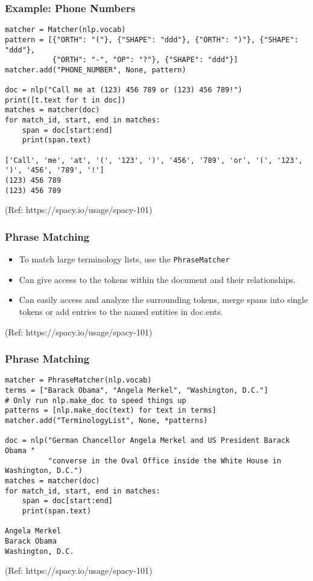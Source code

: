\begin{frame}[fragile]\frametitle{Example: Phone Numbers}



\begin{lstlisting}
matcher = Matcher(nlp.vocab)
pattern = [{"ORTH": "("}, {"SHAPE": "ddd"}, {"ORTH": ")"}, {"SHAPE": "ddd"},
           {"ORTH": "-", "OP": "?"}, {"SHAPE": "ddd"}]
matcher.add("PHONE_NUMBER", None, pattern)

doc = nlp("Call me at (123) 456 789 or (123) 456 789!")
print([t.text for t in doc])
matches = matcher(doc)
for match_id, start, end in matches:
    span = doc[start:end]
    print(span.text)
		
['Call', 'me', 'at', '(', '123', ')', '456', '789', 'or', '(', '123', ')', '456', '789', '!']
(123) 456 789
(123) 456 789		
\end{lstlisting}


{\tiny (Ref: https://spacy.io/usage/spacy-101)}
\end{frame}



\begin{frame}[fragile]\frametitle{Phrase Matching }

  \begin{itemize}
    \item To match large terminology lists, use the \lstinline|PhraseMatcher|
		\item Can give access to the tokens within the document and their relationships.
		\item Can easily access and analyze the surrounding tokens, merge spans into single tokens or add entries to the named entities in doc.ents.
  \end{itemize}
	
{\tiny (Ref: https://spacy.io/usage/spacy-101)}
\end{frame}

\begin{frame}[fragile]\frametitle{Phrase Matching }

\begin{lstlisting}
matcher = PhraseMatcher(nlp.vocab)
terms = ["Barack Obama", "Angela Merkel", "Washington, D.C."]
# Only run nlp.make_doc to speed things up
patterns = [nlp.make_doc(text) for text in terms]
matcher.add("TerminologyList", None, *patterns)

doc = nlp("German Chancellor Angela Merkel and US President Barack Obama "
          "converse in the Oval Office inside the White House in Washington, D.C.")
matches = matcher(doc)
for match_id, start, end in matches:
    span = doc[start:end]
    print(span.text)
		
Angela Merkel
Barack Obama
Washington, D.C.
\end{lstlisting}


{\tiny (Ref: https://spacy.io/usage/spacy-101)}
\end{frame}


